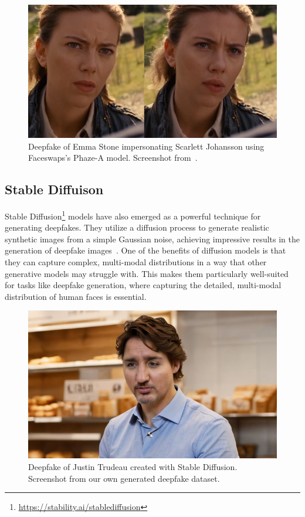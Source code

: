 \begin{figure}[ht]
	\centering
	\includegraphics[scale=0.32]{figures/emma-stone-faceswap}
	\caption{Deepfake of Emma Stone impersonating Scarlett Johansson using
		Faceswaps's Phaze-A model. Screenshot from~\cite{emma-stone-faceswap}.}
\end{figure}

\subsection{Stable Diffuison}
Stable Diffusion\footnote{\url{https://stability.ai/stablediffusion}} models have
also emerged as a powerful technique for generating deepfakes.
They utilize a diffusion process to generate realistic synthetic images from a
simple Gaussian noise, achieving impressive results in the generation of
deepfake images~\cite{wu2022unifying}. One of the benefits of diffusion models
is that they can capture complex, multi-modal distributions in a way that
other generative models may struggle with. This makes them particularly
well-suited for tasks like deepfake generation, where capturing the
detailed, multi-modal distribution of human faces is essential.

\begin{figure}[ht]
	\centering
	\includegraphics[width=0.59\columnwidth]{figures/justion-trudeau-stable-diff}
	\caption{Deepfake of Justin Trudeau created with Stable Diffusion.
		Screenshot from our own generated deepfake dataset.} %
\end{figure}

